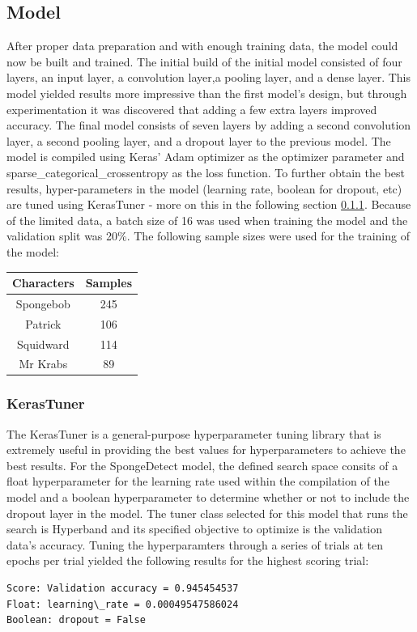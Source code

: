 \documentclass{article}
\begin{document}
\begin{multicols}{2}
\subsection{Model}
\label{sec:model}
{\quad
After proper data preparation and with enough training data, the model could now be built and trained. The initial build of the initial model consisted of four layers, an input layer, a convolution layer,a pooling layer, and a dense layer. This model yielded results more impressive than the first model's design, but through experimentation it was discovered that adding a few extra layers improved accuracy. The final model consists of seven layers by adding a second convolution layer, a second pooling layer, and a dropout layer to the previous model. The model is compiled using Keras' Adam optimizer as the optimizer parameter and sparse\_categorical\_crossentropy as the loss function. To further obtain the best results, hyper-parameters in the model (learning rate, boolean for dropout, etc) are tuned using KerasTuner - more on this in the following section \ref{sec:tuner}. Because of the limited data, a batch size of 16 was used when training the model and the validation split was 20\%. The following sample sizes were used for the training of the model:
\vskip 0.1in
\begin{center}
\begin{tabular}{||c | c||} 
 \hline
 Characters & Samples \\ [0.5ex] 
 \hline
 Spongebob & 245 \\ 
 \hline
 Patrick & 106 \\
 \hline
 Squidward & 114 \\
 \hline
 Mr Krabs & 89 \\ [1ex]
 \hline
\end{tabular}
\end{center}
}
\vskip 0.1in

\subsubsection{KerasTuner}
\label{sec:tuner}
{\quad
The KerasTuner \cite {omalley2019kerastuner} is a general-purpose hyperparameter tuning library that is extremely useful in providing the best values for hyperparameters to achieve the best results. For the SpongeDetect model, the defined search space consits of a float hyperparameter for the learning rate used within the compilation of the model and a boolean hyperparameter to determine whether or not to include the dropout layer in the model. The tuner class selected for this model that runs the search is Hyperband and its specified objective to optimize is the validation data's accuracy. Tuning the hyperparamters through a series of trials at ten epochs per trial yielded the following results for the highest scoring trial:
 \begin{verbatim}
Score: Validation accuracy = 0.945454537
Float: learning\_rate = 0.00049547586024
Boolean: dropout = False
 \end{verbatim}
}


\end{multicols}
\end{document}
